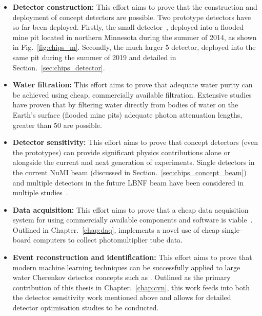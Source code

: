 \begin{itemize}
    \item \textbf{Detector construction:} This effort aims to prove that the construction and
          deployment of \chips concept detectors are possible. Two prototype detectors have so far
          been deployed. Firstly, the small \chipsm detector~\cite{perch2015, pfutznerProto2017,
              pfutzner2017}, deployed into a flooded mine pit located in northern Minnesota during the
          summer of 2014, as shown in Fig.~\ref{fig:chips_m}. Secondly, the much larger
          \unit{5}{} \chipsfive detector, deployed into the same pit during the summer
          of 2019 and detailed in Section.~\ref{sec:chips_detector}.

    \item \textbf{Water filtration:} This effort aims to prove that adequate water purity can be
          achieved using cheap, commercially available filtration. Extensive
          studies~\cite{amat2017, campbell2020} have proven that by filtering water directly from
          bodies of water on the Earth's surface (flooded mine pits) adequate photon attenuation
          lengths, greater than \unit{50}{} are possible.

    \item \textbf{Detector sensitivity:} This effort aims to prove that \chips concept detectors
          (even the prototypes) can provide significant physics contributions alone or alongside
          the current and next generation of experiments. Single detectors in the current NuMI
          beam (discussed in Section.~\ref{sec:chips_concept_beam}) and multiple detectors in the
          future LBNF beam have been considered in multiple studies~\cite{pfutzner2017, adde2016,
              lang2015}.

    \item \textbf{Data acquisition:} This effort aims to prove that a cheap data acquisition
          system for \chips using commercially available components and software is
          viable~\cite{eijk2018}. Outlined in Chapter.~\ref{chap:daq}, \chips implements a novel
          use of cheap single-board computers to collect photomultiplier tube data.

    \item \textbf{Event reconstruction and identification:} This effort aims to prove that modern
          machine learning techniques can be successfully applied to large water Cherenkov
          detector concepts such as \chips. Outlined as the primary contribution of this thesis in
          Chapter.~\ref{chap:cvn}, this work feeds into both the detector sensitivity work
          mentioned above and allows for detailed detector optimisation studies to be conducted.
\end{itemize}

